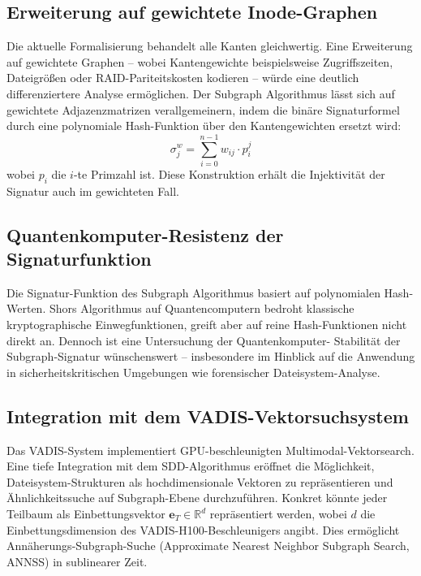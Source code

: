 ﻿\documentclass[a4paper,12pt]{article}
\theoremstyle{definition}
\begin{document}
\subsection{Erweiterung auf gewichtete Inode-Graphen}

Die aktuelle Formalisierung behandelt alle Kanten gleichwertig. Eine
Erweiterung auf gewichtete Graphen -- wobei Kantengewichte beispielsweise
Zugriffszeiten, Dateigr\"o\ss{}en oder RAID-Pariteitskosten kodieren --
w\"urde eine deutlich differenziertere Analyse erm\"oglichen. Der
Subgraph Algorithmus l\"asst sich auf gewichtete Adjazenzmatrizen
verallgemeinern, indem die bin\"are Signaturformel durch eine
polynomiale Hash-Funktion \"uber den Kantengewichten ersetzt wird:
\[
    \sigma_j^w = \sum_{i=0}^{n-1} w_{ij} \cdot p_i^j
\]
wobei $p_i$ die $i$-te Primzahl ist. Diese Konstruktion erh\"alt die
Injektivit\"at der Signatur auch im gewichteten Fall.

\subsection{Quantenkomputer-Resistenz der Signaturfunktion}

Die Signatur-Funktion des Subgraph Algorithmus basiert auf polynomialen
Hash-Werten. Shors Algorithmus auf Quantencomputern bedroht klassische
kryptographische Einwegfunktionen, greift aber auf reine Hash-Funktionen
nicht direkt an. Dennoch ist eine Untersuchung der Quantenkomputer-
Stabilit\"at der Subgraph-Signatur w\"unschenswert -- insbesondere im
Hinblick auf die Anwendung in sicherheitskritischen Umgebungen wie
forensischer Dateisystem-Analyse.

\subsection{Integration mit dem VADIS-Vektorsuchsystem}

Das VADIS-System \cite{epp2026vadis} implementiert GPU-beschleunigten
Multimodal-Vektorsearch. Eine tiefe Integration mit dem SDD-Algorithmus
er\"offnet die M\"oglichkeit, Dateisystem-Strukturen als hochdimensionale
Vektoren zu repr\"asentieren und \"Ahnlichkeitssuche auf Subgraph-Ebene
durchzuf\"uhren. Konkret k\"onnte jeder Teilbaum als Einbettungsvektor
$\mathbf{e}_T \in \mathbb{R}^d$ repr\"asentiert werden, wobei $d$ die
Einbettungsdimension des VADIS-H100-Beschleunigers angibt. Dies erm\"oglicht
Ann\"aherungs-Subgraph-Suche (Approximate Nearest Neighbor Subgraph Search,
ANNSS) in sublinearer Zeit.
\end{document}
